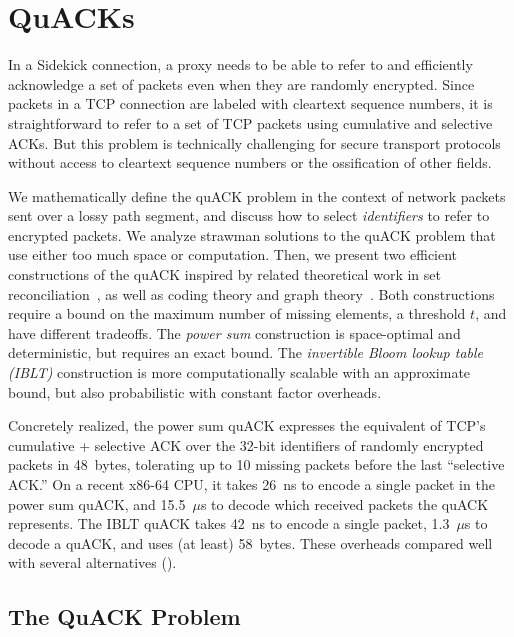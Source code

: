 \chapter{QuACKs}
\label{sec:quack}

In a Sidekick connection, a proxy needs to be able to refer to and efficiently
acknowledge a set of packets even when they are randomly encrypted. Since
packets in a TCP connection are labeled with cleartext sequence numbers, it is
straightforward to refer to a set of TCP packets using cumulative and selective
ACKs. But this problem is technically challenging for secure transport
protocols without access to cleartext sequence numbers or the ossification of
other fields.

We mathematically define the quACK problem in the context of network packets
sent over a lossy path segment, and discuss how to select \emph{identifiers} to
refer to encrypted packets. We analyze strawman solutions to the quACK problem
that use either too much space or computation. Then, we present two efficient
constructions of the quACK inspired by related theoretical work in set
reconciliation~\cite{minsky2003set,eppstein2011straggler}, as well as coding
theory and graph theory~\cite{karpovsky2003data}. Both constructions require a
bound on the maximum number of missing elements, a threshold $t$, and have
different tradeoffs. The \textit{power sum} construction is space-optimal and
deterministic, but requires an exact bound. The \textit{invertible Bloom lookup
table (IBLT)} construction is more computationally scalable with an approximate
bound, but also probabilistic with constant factor overheads.


Concretely realized, the power sum quACK expresses the equivalent of TCP's
cumulative + selective ACK over the 32-bit identifiers of randomly encrypted
packets in 48~bytes, tolerating up to 10 missing packets before the last
``selective ACK.'' On a recent x86-64 CPU, it takes 26~ns to encode a single
packet in the power sum quACK, and 15.5~$\mu$s to decode which received packets
the quACK represents. The IBLT quACK takes 42~ns to encode a single packet,
1.3~$\mu$s to decode a quACK, and uses (at least) 58~bytes. These overheads
compared well with several alternatives ().

\section{The QuACK Problem}
\label{sec:quack:problem}

